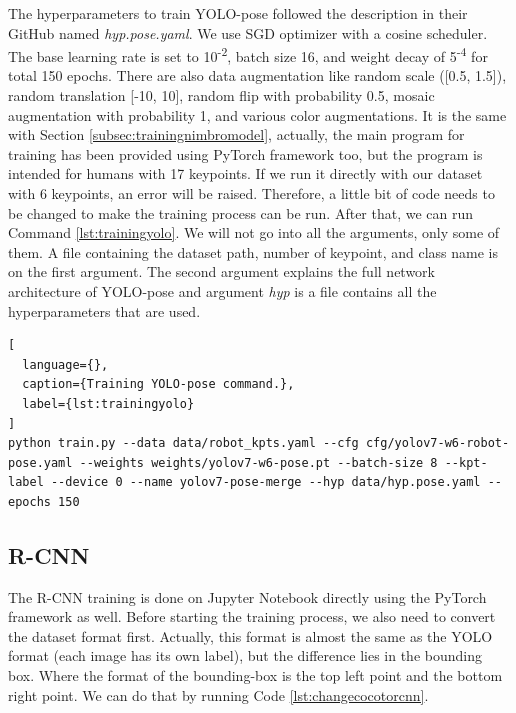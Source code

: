 The hyperparameters to train YOLO-pose followed the description in their GitHub named \emph{hyp.pose.yaml}.
We use SGD optimizer with a cosine scheduler. The base learning rate is set to 10\textsuperscript{-2}, batch size 16,
and weight decay of 5\textsuperscript{-4} for total 150 epochs. There are also data augmentation like random scale ([0.5, 1.5]),
random translation [-10, 10], random flip with probability 0.5, mosaic augmentation with probability 1, and various color augmentations.
It is the same with Section \ref{subsec:trainingnimbromodel}, actually, the main program for training has been provided using PyTorch framework too, but the program is intended for humans with 17 keypoints.
If we run it directly with our dataset with 6 keypoints, an error will be raised. Therefore, a little bit of code needs to be changed to make the training process can be run.
After that, we can run Command \ref{lst:trainingyolo}. We will not go into all the arguments, only some of them. 
A file containing the dataset path, number of keypoint, and class name is on the first argument. The second argument explains the full network architecture of YOLO-pose and 
argument \emph{hyp} is a file contains all the hyperparameters that are used.

\begin{lstlisting}[
  language={},
  caption={Training YOLO-pose command.},
  label={lst:trainingyolo}
]
python train.py --data data/robot_kpts.yaml --cfg cfg/yolov7-w6-robot-pose.yaml --weights weights/yolov7-w6-pose.pt --batch-size 8 --kpt-label --device 0 --name yolov7-pose-merge --hyp data/hyp.pose.yaml --epochs 150
\end{lstlisting}

\subsection{R-CNN}
\label{subsec:trainingrcnn}

The R-CNN training is done on Jupyter Notebook directly using the PyTorch framework as well.
Before starting the training process, we also need to convert the dataset format first.
Actually, this format is almost the same as the YOLO format (each image has its own label), but the difference lies in the bounding box.
Where the format of the bounding-box is the top left point and the bottom right point. We can do that by running Code \ref{lst:changecocotorcnn}.



